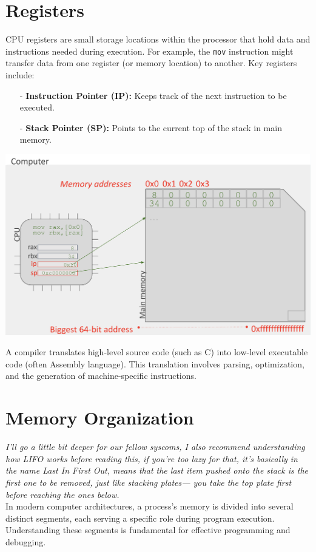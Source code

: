 \documentclass[../../compsys.tex]{subfiles}
\begin{document}
\section{Registers}
\begin{minipage}{0.45\textwidth}
CPU registers are small storage locations within the processor that hold data and instructions needed during execution. For example, the \texttt{mov} instruction might transfer data from one register (or memory location) to another. Key registers include:
\begin{itemize}
  \item[-] \textbf{Instruction Pointer (IP):} Keeps track of the next instruction to be executed.
  \item[-] \textbf{Stack Pointer (SP):} Points to the current top of the stack in main memory.
\end{itemize}
\end{minipage}
\hfill
\vline
\hfill
\begin{minipage}{0.45\textwidth} 
\begin{center}
    \includegraphics[width=1.1\textwidth]{chapters/L2/images/registers.png}
\end{center}
\end{minipage}
\newpage
\begin{definition}[Compiler]
A compiler translates high-level source code (such as C) into low-level executable code (often Assembly language). This translation involves parsing, optimization, and the generation of machine-specific instructions.
\end{definition}

\section{Memory Organization}
\textit{I'll go a little bit deeper for our fellow syscoms, I also recommend understanding how LIFO works before reading this, if you're too lazy for that, it's basically in the name Last In First Out, means that the last item pushed onto the stack is the first one to be removed, just like stacking plates— you take the top plate first before reaching the ones below. } \\
In modern computer architectures, a process's memory is divided into several distinct segments, each serving a specific role during program execution. Understanding these segments is fundamental for effective programming and debugging. \\[10px]
\end{document}
